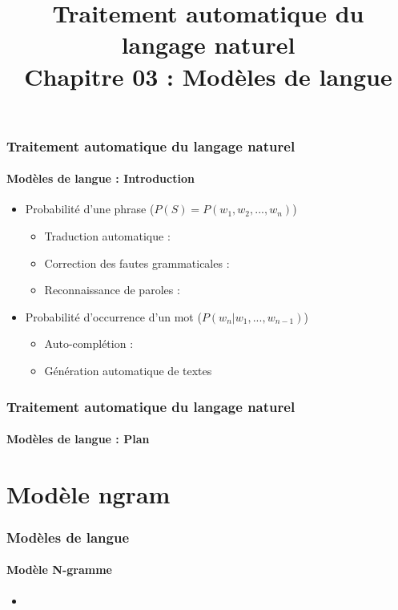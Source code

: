 \documentclass[xcolor=table]{beamer}
\title[TALN : 03- Modèles de langue]%
{Traitement automatique du langage naturel\\Chapitre 03 : Modèles de langue}
\begin{document}
	
\begin{frame}
\frametitle{Traitement automatique du langage naturel}
\framesubtitle{Modèles de langue : Introduction}

\begin{itemize}
	\item Probabilité d'une phrase ($ P(S) = P(w_1, w_2, ..., w_n) $)
	\begin{itemize}
		\item Traduction automatique : \\
		\item Correction des fautes grammaticales : \\
		\item Reconnaissance de paroles : \\
	\end{itemize}
	\item Probabilité d'occurrence d'un mot ($ P(w_n | w_1, ..., w_{n-1}) $)
	\begin{itemize}
		\item Auto-complétion : \\
		\item Génération automatique de textes
	\end{itemize}
\end{itemize}

\end{frame}


\begin{frame}
\frametitle{Traitement automatique du langage naturel}
\framesubtitle{Modèles de langue : Plan}

\begin{multicols}{2}
\tableofcontents
\end{multicols}
\end{frame}

\section{Modèle ngram}

\begin{frame}
\frametitle{Modèles de langue}
\framesubtitle{Modèle N-gramme}

\begin{itemize}
	\item 
\end{itemize}

\end{frame}
\end{document}
